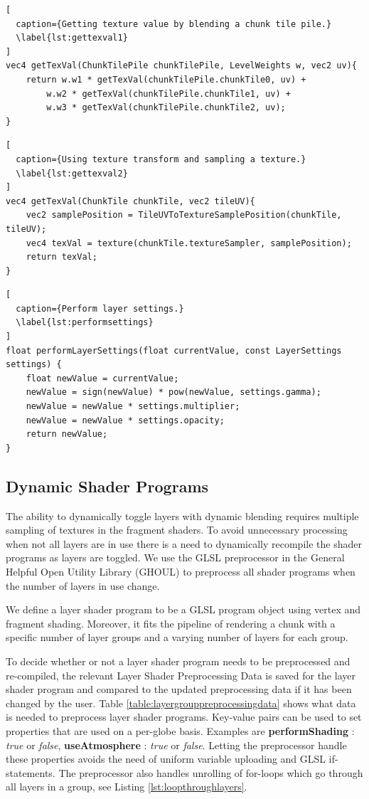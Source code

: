 \begin{lstlisting}[
  caption={Getting texture value by blending a chunk tile pile.} 
  \label{lst:gettexval1}
]
vec4 getTexVal(ChunkTilePile chunkTilePile, LevelWeights w, vec2 uv){
	return w.w1 * getTexVal(chunkTilePile.chunkTile0, uv) + 
		w.w2 * getTexVal(chunkTilePile.chunkTile1, uv) + 
		w.w3 * getTexVal(chunkTilePile.chunkTile2, uv);
}
\end{lstlisting}

\begin{lstlisting}[
  caption={Using texture transform and sampling a texture.} 
  \label{lst:gettexval2}
]
vec4 getTexVal(ChunkTile chunkTile, vec2 tileUV){
	vec2 samplePosition = TileUVToTextureSamplePosition(chunkTile, tileUV);
	vec4 texVal = texture(chunkTile.textureSampler, samplePosition);
	return texVal;
}
\end{lstlisting}


\begin{lstlisting}[
  caption={Perform layer settings.} 
  \label{lst:performsettings}
]
float performLayerSettings(float currentValue, const LayerSettings settings) {
	float newValue = currentValue;
	newValue = sign(newValue) * pow(newValue, settings.gamma);
	newValue = newValue * settings.multiplier;
	newValue = newValue * settings.opacity;
	return newValue;
}
\end{lstlisting}

\subsection{Dynamic Shader Programs}

The ability to dynamically toggle layers with dynamic blending requires multiple sampling of textures in the fragment shaders. To avoid unnecessary processing when not all layers are in use there is a need to dynamically recompile the shader programs as layers are toggled. We use the GLSL preprocessor in the General Helpful Open Utility Library (GHOUL) \cite{ghoul} to preprocess all shader programs when the number of layers in use change.

We define a layer shader program to be a GLSL program object using vertex and fragment shading. Moreover, it fits the pipeline of rendering a chunk with a specific number of layer groups and a varying number of layers for each group.

To decide whether or not a layer shader program needs to be preprocessed and re-compiled, the relevant Layer Shader Preprocessing Data is saved for the layer shader program and compared to the updated preprocessing data if it has been changed by the user. Table \ref{table:layergrouppreprocessingdata} shows what data is needed to preprocess layer shader programs. Key-value pairs can be used to set properties that are used on a per-globe basis. Examples are \textbf{performShading} : \emph{true} or \emph{false}, \textbf{useAtmosphere} : \emph{true} or \emph{false}. Letting the preprocessor handle these properties avoids the need of uniform variable uploading and GLSL if-statements. The preprocessor also handles unrolling of for-loops which go through all layers in a group, see Listing \ref{lst:loopthroughlayers}.


